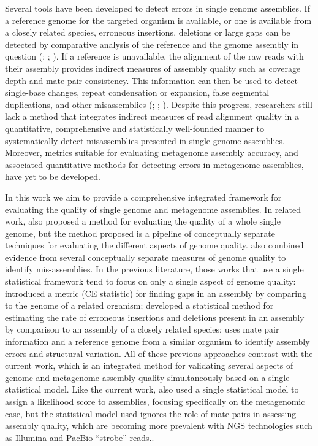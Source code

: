 \documentclass[phd,tocprelim]{cornell}
\begin{document}
Several tools have been developed to detect errors in single genome assemblies. If a reference genome for the targeted organism is available, or one is available from a closely related species, erroneous insertions, deletions or large gaps can be detected by comparative analysis of the reference and the genome assembly in question (\cite{Meader2010}; \cite{Salzberg2012}; \cite{Zimin2008}). If a reference is unavailable, the alignment of the raw reads with their assembly provides indirect measures of assembly quality such as coverage depth and mate pair consistency. This information can then be used to detect single-base changes, repeat condensation or expansion, false segmental duplications, and other misassemblies (\cite{Choi2008}; \cite{Phillippy2008}; \cite{Narzisi2011}). Despite this progress, researchers still lack a method that integrates indirect measures of read alignment quality in a quantitative, comprehensive and statistically well-founded manner to systematically detect misassemblies presented in single genome assemblies. Moreover, metrics suitable for evaluating metagenome assembly accuracy, and associated quantitative methods for detecting errors in metagenome assemblies, have yet to be developed.

In this work we aim to provide a comprehensive integrated framework for evaluating the quality of single genome and metagenome assemblies.  In related work, \cite{Phillippy2008} also proposed a method for evaluating the quality of a whole single genome, but the method proposed is a pipeline of conceptually separate techniques for evaluating the different aspects of genome quality.  \cite{Choi2008} also combined evidence from several conceptually separate measures of genome quality to identify mis-assemblies.  In the previous literature, those works that use a single statistical framework tend to focus on only a single aspect of genome quality: \cite{Zimin2008} introduced a metric (CE statistic) for finding gaps in an assembly by comparing to the genome of a related organism; \cite{Meader2010} developed a statistical method for estimating the rate of erroneous insertions and deletions present in an assembly by comparison to an assembly of a closely related species; \cite{Olson2009} uses mate pair information and a reference genome from a similar organism to identify assembly errors and structural variation.  All of these previous approaches contrast with the current work, which is an integrated method for validating several aspects of genome and metagenome assembly quality simultaneously based on a single statistical model.  Like the current work, \cite{Laserson2011} also used a single statistical model to assign a likelihood score to assemblies, focusing specifically on the metagenomic case, but the statistical model used ignores the role of mate pairs in assessing assembly quality, which are becoming more prevalent with NGS technologies such as Illumina and PacBio “strobe” reads..
\end{document}
